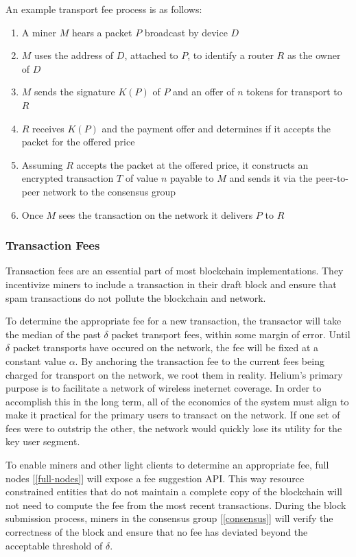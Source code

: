 \documentclass[10pt, nonatbib, nocopyrightspace, reprint]{sigplanconf}
\newcommand{\secref}[1]{[\autoref{#1}]}
\begin{document}
An example transport fee process is as follows:

\begin{enumerate}
  \item A miner $M$ hears a packet $P$ broadcast by device $D$
  \item $M$ uses the address of $D$, attached to $P$, to identify a router $R$ as the owner of $D$
  \item $M$ sends the signature $K(P)$ of $P$ and an offer of $n$ tokens for transport to $R$
  \item $R$ receives $K(P)$ and the payment offer and determines if it accepts the packet for the offered price
  \item Assuming $R$ accepts the packet at the offered price, it constructs an encrypted transaction $T$ of value $n$ payable to $M$ and sends it via the peer-to-peer network to the consensus group
  \item Once $M$ sees the transaction on the network it delivers $P$ to $R$
\end{enumerate}

\subsubsection{Transaction Fees} \label{fees}

Transaction fees are an essential part of most blockchain implementations. They incentivize miners to include a transaction in their draft block and ensure that spam transactions do not pollute the blockchain and network.

To determine the appropriate fee for a new transaction, the transactor will take the median of the past $\delta$ packet transport fees, within some margin of error. Until $\delta$ packet transports have occured on the network, the fee will be fixed at a constant value $\alpha$. By anchoring the transaction fee to the current fees being charged for transport on the network, we root them in reality. Helium's primary purpose is to facilitate a network of wireless ineternet coverage. In order to accomplish this in the long term, all of the economics of the system must align to make it practical for the primary users to transact on the network. If one set of fees were to outstrip the other, the network would quickly lose its utility for the key user segment.

To enable miners and other light clients to determine an appropriate fee, full nodes \secref{full-nodes} will expose a fee suggestion API. This way resource constrained entities that do not maintain a complete copy of the blockchain will not need to compute the fee from the most recent transactions. During the block submission process, miners in the consensus group \secref{consensus} will verify the correctness of the block and ensure that no fee has deviated beyond the acceptable threshold of $\delta$.
\end{document}
